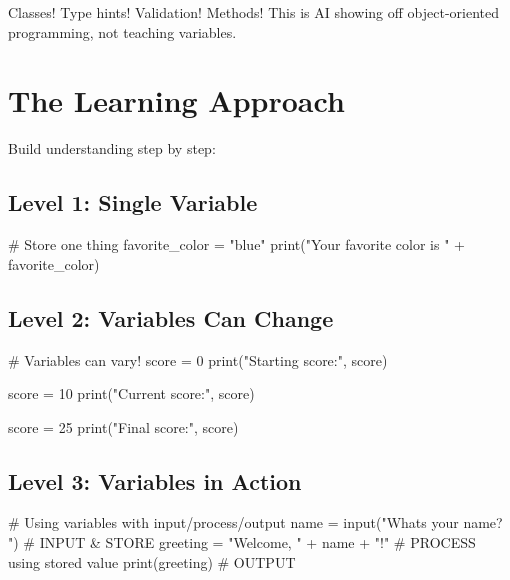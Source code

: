 \documentclass[
  letterpaper,
  DIV=11,
  numbers=noendperiod,
  oneside]{scrreprt}
\newenvironment{Shaded}{}{}
\newcommand{\BuiltInTok}[1]{\textcolor[rgb]{0.84,0.23,0.29}{#1}}
\newcommand{\CommentTok}[1]{\textcolor[rgb]{0.42,0.45,0.49}{#1}}
\newcommand{\DecValTok}[1]{\textcolor[rgb]{0.00,0.36,0.77}{#1}}
\newcommand{\NormalTok}[1]{\textcolor[rgb]{0.14,0.16,0.18}{#1}}
\newcommand{\OperatorTok}[1]{\textcolor[rgb]{0.14,0.16,0.18}{#1}}
\newcommand{\StringTok}[1]{\textcolor[rgb]{0.01,0.18,0.38}{#1}}
\begin{document}
Classes! Type hints! Validation! Methods! This is AI showing off
object-oriented programming, not teaching variables.

\section{The Learning Approach}\label{the-learning-approach-1}

Build understanding step by step:

\subsection{Level 1: Single Variable}\label{level-1-single-variable}

\begin{Shaded}
\begin{Highlighting}[]
\CommentTok{\# Store one thing}
\NormalTok{favorite\_color }\OperatorTok{=} \StringTok{"blue"}
\BuiltInTok{print}\NormalTok{(}\StringTok{"Your favorite color is "} \OperatorTok{+}\NormalTok{ favorite\_color)}
\end{Highlighting}
\end{Shaded}

\subsection{Level 2: Variables Can
Change}\label{level-2-variables-can-change}

\begin{Shaded}
\begin{Highlighting}[]
\CommentTok{\# Variables can vary!}
\NormalTok{score }\OperatorTok{=} \DecValTok{0}
\BuiltInTok{print}\NormalTok{(}\StringTok{"Starting score:"}\NormalTok{, score)}

\NormalTok{score }\OperatorTok{=} \DecValTok{10}
\BuiltInTok{print}\NormalTok{(}\StringTok{"Current score:"}\NormalTok{, score)}

\NormalTok{score }\OperatorTok{=} \DecValTok{25}  
\BuiltInTok{print}\NormalTok{(}\StringTok{"Final score:"}\NormalTok{, score)}
\end{Highlighting}
\end{Shaded}

\subsection{Level 3: Variables in
Action}\label{level-3-variables-in-action}

\begin{Shaded}
\begin{Highlighting}[]
\CommentTok{\# Using variables with input/process/output}
\NormalTok{name }\OperatorTok{=} \BuiltInTok{input}\NormalTok{(}\StringTok{"What\textquotesingle{}s your name? "}\NormalTok{)        }\CommentTok{\# INPUT \& STORE}
\NormalTok{greeting }\OperatorTok{=} \StringTok{"Welcome, "} \OperatorTok{+}\NormalTok{ name }\OperatorTok{+} \StringTok{"!"}       \CommentTok{\# PROCESS using stored value}
\BuiltInTok{print}\NormalTok{(greeting)                           }\CommentTok{\# OUTPUT}
\end{Highlighting}
\end{Shaded}
\end{document}

